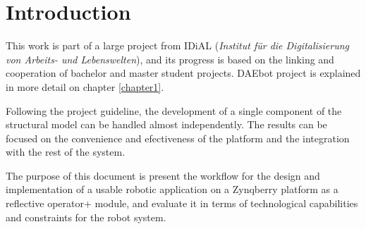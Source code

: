 %  
%  
%  
%  
%  
%  

\chapter*{Introduction}

This work is part of a large project from IDiAL (\textit{Institut für die Digitalisierung von
Arbeits- und Lebens­welten}), and its progress is based on the linking and cooperation of bachelor
and master student projects. DAEbot project is explained in more detail on chapter \ref{chapter1}.

Following the project guideline, the development of a single component of the structural model can
be handled almost independently. The results can be focused on the convenience and efectiveness of
the platform and the integration with the rest of the system.

The purpose of this document is present the workflow for the design and implementation of a usable
robotic application on a Zynqberry platform as a reflective operator+ module, and evaluate it in
terms of technological capabilities and constraints for the robot system.

